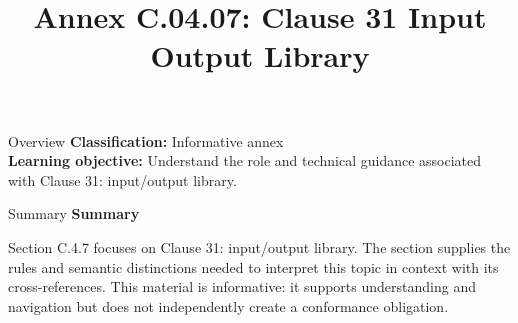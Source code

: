 \documentclass[10pt,letterpaper]{article}
\title{Annex C.04.07: Clause 31 Input Output Library}
\author{}
\date{}
\begin{document}
\maketitle
\begin{CornellOverviewBox}{Overview}
\textbf{Classification:} Informative annex\\[2pt]
\textbf{Learning objective:} Understand the role and technical guidance associated with Clause 31: input/output library.
\end{CornellOverviewBox}\begin{CornellSummaryBox}{Summary}
{\sffamily\bfseries\color{Accent} Summary}\par\vspace{3pt}Section C.4.7 focuses on Clause 31: input/output library. The section supplies the rules and semantic distinctions needed to interpret this topic in context with its cross-references. This material is informative: it supports understanding and navigation but does not independently create a conformance obligation.
\end{CornellSummaryBox}
\end{document}
